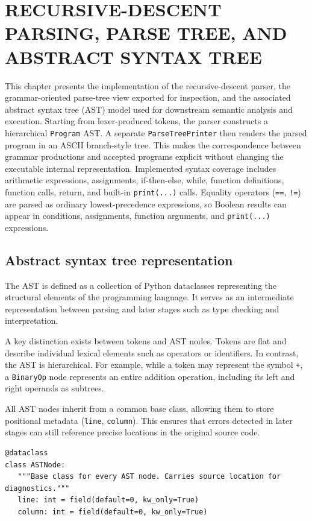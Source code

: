 \chapter{RECURSIVE-DESCENT PARSING, PARSE TREE, AND ABSTRACT SYNTAX TREE}

This chapter presents the implementation of the recursive-descent parser, the
grammar-oriented parse-tree view exported for inspection, and the associated
abstract syntax tree (AST) model used for downstream semantic analysis and
execution. Starting from lexer-produced tokens, the parser constructs a
hierarchical \texttt{Program} AST. A separate \texttt{ParseTreePrinter} then
renders the parsed program in an ASCII branch-style tree. This makes the
correspondence between grammar productions and accepted programs explicit
without changing the executable internal representation.
Implemented syntax coverage includes arithmetic expressions, assignments,
if-then-else, while, function definitions, function calls, return, and
built-in \texttt{print(...)} calls. Equality operators (\texttt{==},
\texttt{!=}) are parsed as ordinary lowest-precedence expressions, so Boolean
results can appear in conditions, assignments, function arguments, and
\texttt{print(...)} expressions.

\section{Abstract syntax tree representation}
The AST is defined as a collection of Python dataclasses representing the
structural elements of the programming language. It serves as an intermediate
representation between parsing and later stages such as type checking and
interpretation.

A key distinction exists between tokens and AST nodes. Tokens are flat and
describe individual lexical elements such as operators or identifiers. In
contrast, the AST is hierarchical. For example, while a token may represent the
symbol \texttt{+}, a \texttt{BinaryOp} node represents an entire addition
operation, including its left and right operands as subtrees.

All AST nodes inherit from a common base class, allowing them to store
positional metadata (\texttt{line}, \texttt{column}). This ensures that errors
detected in later stages can still reference precise locations in the original
source code.

\begin{lstlisting}
@dataclass
class ASTNode:
   """Base class for every AST node. Carries source location for diagnostics."""
   line: int = field(default=0, kw_only=True)
   column: int = field(default=0, kw_only=True)
\end{lstlisting}

